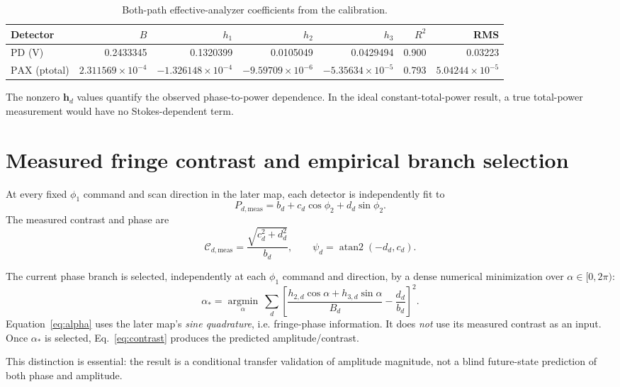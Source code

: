 \documentclass[10pt]{article}
\newcommand{\PD}{\mathrm{PD}}
\newcommand{\PAX}{\mathrm{PAX}}
\begin{document}
\begin{table}[h]
\centering\small
\caption{Both-path effective-analyzer coefficients from the calibration.}
\label{tab:coeff}
\begin{tabular}{lrrrrrr}
\toprule
Detector & $B$ & $h_1$ & $h_2$ & $h_3$ & $R^2$ & RMS\\
\midrule
$\PD$ (V) & 0.2433345 & 0.1320399 & 0.0105049 & 0.0429494 & 0.900 & 0.03223\\
$\PAX$ (ptotal) & $2.311569\times10^{-4}$ & $-1.326148\times10^{-4}$ & $-9.59709\times10^{-6}$ & $-5.35634\times10^{-5}$ & 0.793 & $5.04244\times10^{-5}$\\
\bottomrule
\end{tabular}
\end{table}

The nonzero $\mathbf{h}_d$ values quantify the observed phase-to-power
dependence. In the ideal constant-total-power result, a true total-power
measurement would have no Stokes-dependent term.

\section{Measured fringe contrast and empirical branch selection}
At every fixed $\phi_1$ command and scan direction in the later map, each
detector is independently fit to
\begin{equation}
P_{d,\mathrm{meas}}=b_d+c_d\cos\phi_2+d_d\sin\phi_2.
\end{equation}
The measured contrast and phase are
\begin{equation}
\mathcal{C}_{d,\mathrm{meas}}=\frac{\sqrt{c_d^2+d_d^2}}{b_d},
\qquad \psi_d=\operatorname{atan2}(-d_d,c_d).
\label{eq:measured}
\end{equation}

The current phase branch is selected, independently at each $\phi_1$ command
and direction, by a dense numerical minimization over $\alpha\in[0,2\pi)$:
\begin{equation}
\alpha_* = \underset{\alpha}{\operatorname{argmin}}\ 
\sum_d\left[
\frac{h_{2,d}\cos\alpha+h_{3,d}\sin\alpha}{B_d}
-\frac{d_d}{b_d}\right]^2.
\label{eq:alpha}
\end{equation}
Equation~\eqref{eq:alpha} uses the later map's \emph{sine quadrature}, i.e.
fringe-phase information. It does \emph{not} use its measured contrast as an
input. Once $\alpha_*$ is selected, Eq.~\eqref{eq:contrast} produces the
predicted amplitude/contrast.

This distinction is essential: the result is a conditional transfer validation
of amplitude magnitude, not a blind future-state prediction of both phase and
amplitude.
\end{document}
